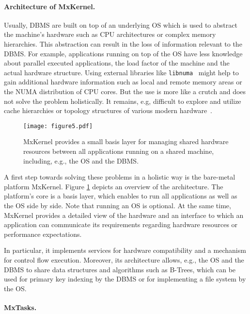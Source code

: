 \documentclass[11pt]{article}
\begin{document}
\paragraph*{Architecture of MxKernel.}
Usually, DBMS are built on top of an underlying OS which is used to abstract the machine's hardware such as CPU architectures or complex memory hierarchies.
This abstraction can result in the loss of information relevant to the DBMS.
For example, applications running on top of the OS have less knowledge about parallel executed applications, the load factor of the machine and the actual hardware structure.
Using external libraries like \texttt{libnuma}~\cite{nollhrm19:kleen2005numa} might help to gain additional hardware information such as local and remote memory areas or the NUMA distribution of CPU cores.
But the use is more like a crutch and does not solve the problem holistically.
It remains, e.g, difficult to explore and utilize cache hierarchies or topology structures of various modern hardware~\cite{nollhrm19:Giceva:2013:COD}.

\begin{figure}
\centering
\texttt{[image: figure5.pdf]}
\caption{%
MxKernel provides a small basis layer for managing shared hardware resources between all applications running on a shared machine, including, e.g., the OS and the DBMS.
}
\label{nollhrm19:plt:mxkernel}
\end{figure}

A first step towards solving these problems in a holistic way is the bare-metal platform MxKernel.
Figure \ref{nollhrm19:plt:mxkernel} depicts an overview of the architecture.
The platform's core is a basis layer, which enables to run all applications as well as the OS side by side.
Note that running an OS is optional.
At the same time, MxKernel provides a detailed view of the hardware and an interface to which an application can communicate its requirements regarding hardware resources or performance expectations.

In particular, it implements services for hardware compatibility and a mechanism for control flow execution.
Moreover, its architecture allows, e.g., the OS and the DBMS to share data structures and algorithms such as B-Trees, which can be used for primary key indexing by the DBMS or for implementing a file system by the OS.

\paragraph*{MxTasks.}
\end{document}
